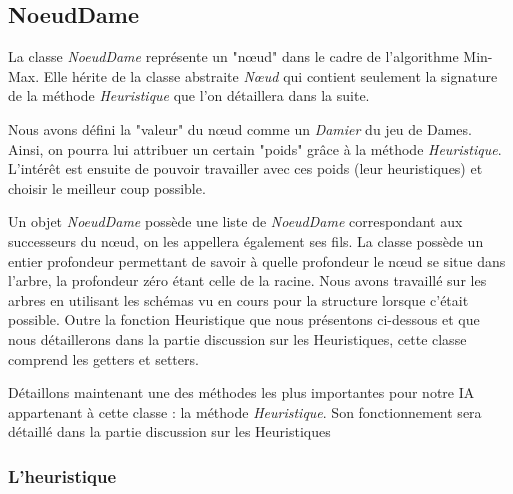\documentclass[12,french]{report}
\begin{document}
\subsection{NoeudDame}

La classe \textit{NoeudDame} représente un "nœud" dans le cadre de l'algorithme Min-Max. Elle hérite de la classe abstraite \textit{Nœud} qui contient seulement la signature de la méthode \textit{Heuristique} que l'on détaillera dans la suite. 


Nous avons défini la "valeur" du nœud comme un \textit{Damier} du jeu de Dames. Ainsi, on pourra lui attribuer un certain "poids" grâce à la méthode \textit{Heuristique}.\\ 
L'intérêt est ensuite de pouvoir travailler avec ces poids (leur heuristiques) et choisir le meilleur coup possible.

Un objet \textit{NoeudDame} possède une liste de \textit{NoeudDame} correspondant aux successeurs du nœud, on les appellera également ses fils. La classe possède un entier profondeur permettant de savoir à quelle profondeur le nœud se situe dans l'arbre, la profondeur zéro étant celle de la racine. Nous avons travaillé sur les arbres en utilisant les schémas vu en cours pour la structure lorsque c'était possible.
Outre la fonction Heuristique que nous présentons ci-dessous et que nous détaillerons dans la partie discussion sur les Heuristiques, cette classe comprend les getters et setters.

Détaillons maintenant une des méthodes les plus importantes pour notre IA appartenant à cette classe : la méthode \textit{Heuristique}.
Son fonctionnement sera détaillé dans la partie discussion sur les Heuristiques

\subsubsection{L'heuristique}

\end{document}
